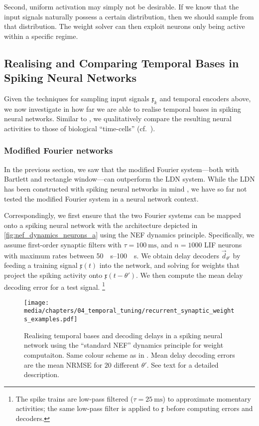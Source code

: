 Second, uniform activation may simply not be desirable.
If we know that the input signals naturally possess a certain distribution, then we should sample from that distribution.
The weight solver can then exploit neurons only being active within a specific regime.

\subsection{Realising and Comparing Temporal Bases in Spiking Neural Networks}
\label{sec:spiking_temporal_bases}

Given the techniques for sampling input signals $\mathfrak{x}_k$ and temporal encoders above, we now investigate in how far we are able to realise temporal bases in spiking neural networks.
Similar to \citet{voelker2018improving}, we qualitatively compare the resulting neural activities to those of biological \enquote{time-cells} (cf.~).

\subsubsection{Modified Fourier networks}
In the previous section, we saw that the modified Fourier system---both with Bartlett and rectangle window---can outperform the LDN system.
While the LDN has been constructed with spiking neural networks in mind \citep{voelker2018improving}, we have so far not tested the modified Fourier system in a neural network context.

Correspondingly, we first ensure that the two Fourier systems can be mapped onto a spiking neural network with the architecture depicted in \cref{fig:nef_dynamics_neurons_a} using the NEF dynamics principle.
Specifically, we assume first-order synaptic filters with $\tau = \SI{100}{\milli\second}$, and $n = 1000$ LIF neurons with maximum rates between \SIrange{50}{100}{\per\second}.
We obtain delay decoders $\vec d_{\theta'}$ by feeding a training signal $\mathfrak{x}(t)$ into the network, and solving for weights that project the spiking activity onto $\mathfrak{x}(t - \theta')$.
We then compute the mean delay decoding error for a test signal.%
\footnote{
The spike trains are low-pass filtered ($\tau = \SI{25}{\milli\second}$) to approximate momentary activities; the same low-pass filter is applied to $\mathfrak{x}$ before computing errors and decoders.
}
\begin{figure}
	\centering
	\texttt{[image: media/chapters/04\_temporal\_tuning/recurrent\_synaptic\_weights\_examples.pdf]}
	\caption[Realising temporal bases and decoding delays in a spiking neural network]{
	Realising temporal bases and decoding delays in a spiking neural network using the \enquote{standard NEF} dynamics principle for weight computaiton.
	Same colour scheme as in .
	Mean delay decoding errors are the mean NRMSE for $20$ different $\theta'$. See text for a detailed description.
	}
	\label{fig:recurrent_synaptic_weights_examples}
\end{figure}

